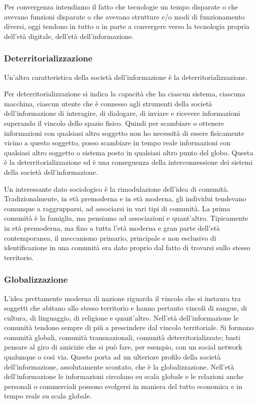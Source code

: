 Per convergenza intendiamo il fatto che tecnologie un tempo disparate o che avevano funzioni disparate o che avevano strutture e/o modi di funzionamento diversi, oggi tendono in tutto o in parte a convergere verso la tecnologia propria dell'età digitale, dell'età dell'informazione.

\subsubsection*{Deterritorializzazione}
Un'altra caratteristica della società dell'informazione è la deterritorializzazione.

Per deterritorializzazione si indica la capacità che ha ciascun sistema, ciascuna macchina, ciascun utente che è connesso agli strumenti della società dell'informazione di interagire, di dialogare, di inviare e ricevere informazioni superando il vincolo dello spazio fisico. 
Quindi per scambiare o ottenere informazioni con qualsiasi altro soggetto non ho necessità di essere fisicamente vicino a questo soggetto, posso scambiare in tempo reale informazioni con qualsiasi altro soggetto o sistema posto in qualsiasi altro punto del globo. Questa è la deterritorializzazione ed è una conseguenza della interconnessione dei sistemi della società dell'informazione.
 
Un interessante dato sociologico è la rimodulazione dell'idea di comunità. Tradizionalmente, in età premoderna e in età moderna, gli individui tendevano comunque a raggrupparsi, ad associarsi in vari tipi di comunità. La prima comunità è la famiglia, ma pensiamo ad associazioni e quant'altro. Tipicamente in età premoderna, ma fino a tutta l'età moderna e gran parte dell'età contemporanea, il meccanismo primario, principale e non esclusivo di identificazione in una comunità era dato proprio dal fatto di trovarsi sullo stesso territorio. 

\subsubsection*{Globalizzazione}
L'idea prettamente moderna di nazione riguarda il vincolo che si instaura tra soggetti che abitano allo stesso territorio e hanno pertanto vincoli di sangue, di cultura, di linguaggio, di religione e quant'altro. Nell'età dell'informazione le comunità tendono sempre di più a prescindere dal vincolo territoriale. 
Si formano comunità globali, comunità transnazionali, comunità deterritorializzate; basti pensare al giro di amicizie che si può fare, per esempio, con un social network qualunque o così via. Questo porta ad un ulteriore profilo della società dell'informazione, assolutamente scontato, che è la globalizzazione. Nell'età dell'informazione le informazioni circolano su scala globale e le relazioni anche personali o commerciali possono svolgersi in maniera del tutto economica e in tempo reale su scala globale. 

